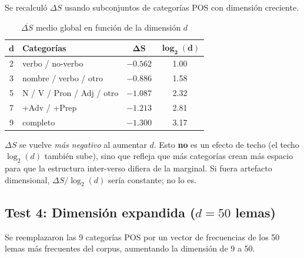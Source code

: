 \documentclass[12pt,a4paper]{article}
\begin{document}
Se recalcul\'o $\Delta S$ usando subconjuntos de categor\'ias POS con dimensi\'on creciente.

\begin{table}[H]
\centering
\caption{$\overline{\Delta S}$ medio global en funci\'on de la dimensi\'on $d$}
\label{tab:dimsens}
\begin{tabular}{clcc}
\toprule
$\boldsymbol{d}$ & \textbf{Categor\'ias} & $\boldsymbol{\overline{\Delta S}}$ & $\boldsymbol{\log_2(d)}$ \\
\midrule
2 & verbo / no-verbo        & $-0.562$ & 1.00 \\
3 & nombre / verbo / otro   & $-0.886$ & 1.58 \\
5 & N / V / Pron / Adj / otro & $-1.087$ & 2.32 \\
7 & +Adv / +Prep             & $-1.213$ & 2.81 \\
9 & completo                 & $-1.300$ & 3.17 \\
\bottomrule
\end{tabular}
\end{table}

$\Delta S$ se vuelve \emph{m\'as negativo} al aumentar $d$. Esto \textbf{no} es un efecto
de techo (el techo $\log_2(d)$ tambi\'en sube), sino que refleja que m\'as categor\'ias
crean m\'as espacio para que la estructura inter-verso difiera de la marginal.
Si fuera artefacto dimensional, $\Delta S / \log_2(d)$ ser\'ia constante; no lo es.

\subsection{Test 4: Dimensi\'on expandida ($d = 50$ lemas)}

Se reemplazaron las 9 categor\'ias POS por un vector de frecuencias de los 50 lemas
m\'as frecuentes del corpus, aumentando la dimensi\'on de 9 a 50.

\begin{center}
\end{center}
\end{document}
